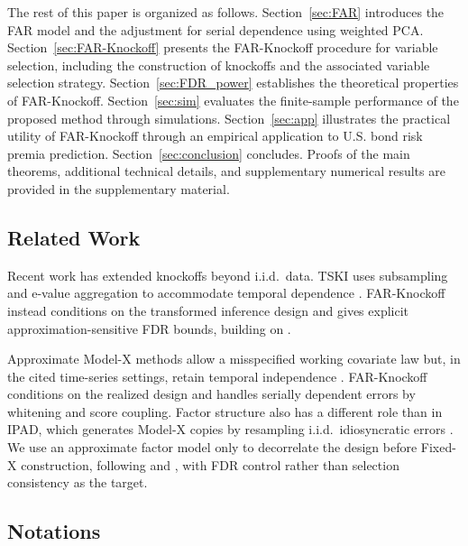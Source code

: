 ﻿\documentclass[12pt]{article}
\newcommand{\0}{\mbox{\bf 0}}
\theoremstyle{plain}%
\theoremstyle{definition}
\begin{document}
The rest of this paper is organized as follows. Section~\ref{sec:FAR} introduces the FAR model and the adjustment for serial dependence using weighted PCA. Section~\ref{sec:FAR-Knockoff}
 presents the FAR-Knockoff procedure for variable selection, including the construction of knockoffs and the associated variable selection strategy. Section~\ref{sec:FDR_power} establishes the theoretical properties of FAR-Knockoff. Section~\ref{sec:sim} evaluates the finite-sample performance of the proposed method through simulations. Section~\ref{sec:app} illustrates the practical utility of FAR-Knockoff through an empirical application to U.S. bond risk premia prediction. Section~\ref{sec:conclusion} concludes. Proofs of the main theorems, additional technical details, and supplementary numerical results are provided in the supplementary material.


\subsection{Related Work}
\label{sec:related}

Recent work has extended knockoffs beyond i.i.d.\ data. TSKI uses subsampling and e-value aggregation to accommodate temporal dependence \citep{ChiFanIngLv2025}. FAR-Knockoff instead conditions on the transformed inference design and gives explicit approximation-sensitive FDR bounds, building on \citet{BarberCandesSamworth2020}.

Approximate Model-X methods allow a misspecified working covariate law but, in the cited time-series settings, retain temporal independence \citep{FanGaoLv2025,FanGaoLvXu2025}. FAR-Knockoff conditions on the realized design and handles serially dependent errors by whitening and score coupling. Factor structure also has a different role than in IPAD, which generates Model-X copies by resampling i.i.d.\ idiosyncratic errors \citep{FanLvSharifvaghefiUematsu2020}. We use an approximate factor model \citep{Bai2003} only to decorrelate the design before Fixed-X construction, following \citet{FanKeWang2020} and \citet{FanJiangSun2022}, with FDR control rather than selection consistency as the target.



\subsection{Notations}
\label{sec:notation}
\end{document}
